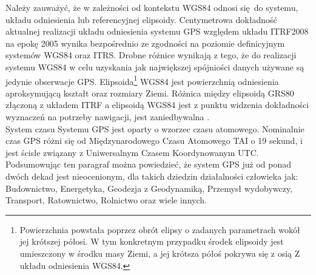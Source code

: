 Należy zauważyć, że w zależności od kontekstu WGS84 odnosi się do systemu, układu odniesienia lub referencyjnej elipsoidy.
Centymetrowa dokładność aktualnej realizacji układu odniesienia systemu GPS względem układu ITRF2008 na epokę 2005
wynika bezpośrednio ze zgodności na poziomie definicyjnym systemów WGS84 oraz ITRS. Drobne różnice wynikają z tego, że do realizacji systemu WGS84 w celu uzyskania jak 
największej spójniości danych używane są jedynie obserwacje GPS. Elipsoida\footnote{Powierzchnia powstała poprzez obrót elipsy o zadanych parametrach wokół jej 
krótszej półosi. W tym konkretnym przypadku środek elipsoidy jest umieszczony w środku masy Ziemi, a jej krótsza półoś pokrywa się z osią Z układu odniesienia WGS84.}
WGS84 jest powierzchnią odniesienia aproksymującą kształt oraz rozmiary Ziemi. Różnica między elipsoidą GRS80 złączoną z układem ITRF a elipsoidą WGS84 jest z punktu 
widzenia dokładności wyznaczeń na potrzeby nawigacji, jest zaniedbywalna \cite[][strona 50]{donnelly}.\\
\indent System czasu Systemu GPS jest oparty o wzorzec czasu atomowego. Nominalnie czas GPS różni się od Międzynarodowego Czasu Atomowego TAI o 19 sekund, i jest 
ścisle związany z Uniwersalnym Czasem Koordynowanym UTC.\\
Podsumowując ten paragraf można powiedzieć, że system GPS już od ponad dwóch dekad jest nieocenionym, dla takich dziedzin działalności człowieka jak:
Budownictwo, Energetyka, Geodezja z Geodynamiką, Przemysł wydobywczy, Transport, Ratownictwo, Rolnictwo oraz wiele innych.
